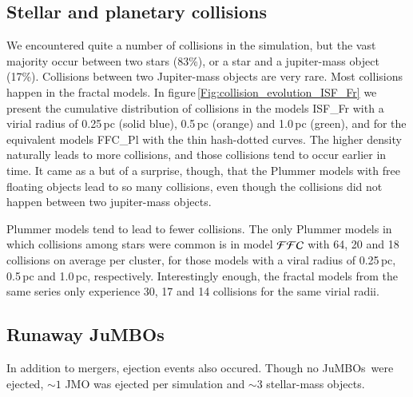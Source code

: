 \documentclass[submission,phys]{lib/SciPost}
\newcommand{\jumbos}{\mbox{JuMBOs}}
\begin{document}
\subsection{Stellar and planetary collisions}

We encountered quite a number of collisions in the simulation, but the
vast majority occur between two stars (83\%), or a star and a
jupiter-mass object (17\%).  Collisions between two Jupiter-mass
objects are very rare.  Most collisions happen in the fractal models.
In figure\,\ref{Fig:collision_evolution_ISF_Fr} we present the
cumulative distribution of collisions in the models {\cal ISF}\_Fr
with a virial radius of 0.25\,pc (solid blue), 0.5\,pc (orange) and
1.0\,pc (green), and for the equivalent models {\cal FFC}\_Pl with the
thin hash-dotted curves.  The higher density naturally leads to more
collisions, and those collisions tend to occur earlier in time.  It
came as a but of a surprise, though, that the Plummer models with free
floating objects lead to so many collisions, even though the
collisions did not happen between two jupiter-mass objects.

Plummer models tend to lead to fewer collisions.  The only Plummer
models in which collisions among stars were common is in model ${\cal
  FFC}$ with 64, 20 and 18 collisions on average per cluster, for
those models with a viral radius of 0.25\,pc, 0.5\,pc and 1.0\,pc,
respectively.  Interestingly enough, the fractal models from the same
series only experience 30, 17 and 14 collisions for the same virial
radii.

\subsection{Runaway \jumbos}

In addition to mergers, ejection events also occured. Though no
\jumbos\, were ejected, $\sim1$ JMO was ejected per simulation and
$\sim 3$ stellar-mass objects.
\end{document}
